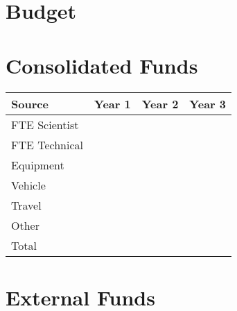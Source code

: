 \documentclass[version=last,
    paper=a4,                               %
    10pt,                                   %
    dvipsnames,
    oneside,                              %
    headings=openany,                       %
    open=any,
    BCOR=7mm,                               %
    DIV=15,     %
]{scrbook}
\begin{document}
\section*{Budget}

\section*{Consolidated Funds }



\begin{longtabu} to \linewidth { |  X | X | X | X | }
\hline
{}
Source & Year 1 & Year 2 & Year 3\\
\hline
\endhead



FTE Scientist &  &  & \\



FTE Technical &  &  & \\



Equipment &  &  & \\



Vehicle &  &  & \\



Travel &  &  & \\



Other &  &  & \\



Total &  &  & \\


\hline
\end{longtabu}



\section*{External Funds }
\end{document}
